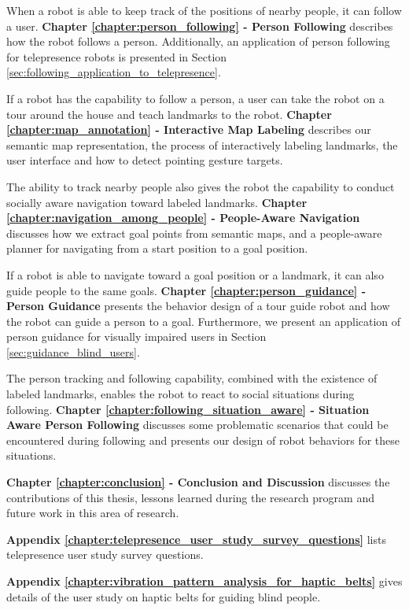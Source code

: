 When a robot is able to keep track of the positions of nearby people, it can follow a user. \textbf{Chapter \ref{chapter:person_following} - Person Following} describes how the robot follows a person. Additionally, an application of person following for telepresence robots is presented in Section \ref{sec:following_application_to_telepresence}.

If a robot has the capability to follow a person, a user can take the robot on a tour around the house and teach landmarks to the robot. \textbf{Chapter \ref{chapter:map_annotation} - Interactive Map Labeling} describes our semantic map representation, the process of interactively labeling landmarks, the user interface and how to detect pointing gesture targets.

The ability to track nearby people also gives the robot the capability to conduct socially aware navigation toward labeled landmarks. \textbf{Chapter \ref{chapter:navigation_among_people} - People-Aware Navigation} discusses how we extract goal points from semantic maps, and a people-aware planner for navigating from a start position to a goal position.

If a robot is able to navigate toward a goal position or a landmark, it can also guide people to the same goals. \textbf{Chapter \ref{chapter:person_guidance} - Person Guidance} presents the behavior design of a tour guide robot and how the robot can guide a person to a goal. Furthermore, we present an application of person guidance for visually impaired users in Section \ref{sec:guidance_blind_users}.

The person tracking and following capability, combined with the existence of labeled landmarks, enables the robot to react to social situations during following. \textbf{Chapter \ref{chapter:following_situation_aware} - Situation Aware Person Following} discusses some problematic scenarios that could be encountered during following and presents our design of robot behaviors for these situations.

\textbf{Chapter \ref{chapter:conclusion} - Conclusion and Discussion} discusses the contributions of this thesis, lessons learned during the research program and future work in this area of research.

\textbf{Appendix \ref{chapter:telepresence_user_study_survey_questions}} lists telepresence user study survey questions.

\textbf{Appendix \ref{chapter:vibration_pattern_analysis_for_haptic_belts}} gives details of the user study on haptic belts for guiding blind people.
